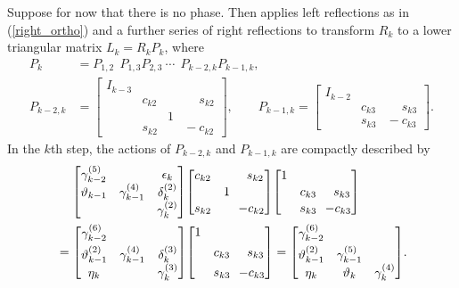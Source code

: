 \documentclass{doc_acmtrans2m}
\begin{document}
Suppose for now that there is no \MINRES phase. Then \MINRESQLP
applies left reflections as in (\ref{right_ortho}) and a further
series of right reflections to transform $R_k$ to a lower triangular
matrix $L_k = R_k P_k$, where
\begin{align*}
     P_k &=  P_{1,2} \ \ P_{1,3} P_{2,3} %
       \ \cdots \ \ P_{k-2,k} P_{k-1,k},
\\ P_{k-2,k} &=  \left[\begin{smallmatrix}
           I_{k-3}&&
        \\        & c_{k2} &    & \!\!\phantom-s_{k2}
        \\        &        & 1  &
        \\        & s_{k2} &    & \!-c_{k2}
        \end{smallmatrix}\right]\!\!,
\qquad P_{k-1,k} =  \left[\begin{smallmatrix}
           I_{k-2}&&
        \\        & c_{k3} &   \!\!\phantom-s_{k3}
        \\        & s_{k3} &   \!-c_{k3}
        \end{smallmatrix}\right]\!\!.
\end{align*}
In the $k$th step, the actions of $P_{k-2,k}$ and $P_{k-1,k}$ are
compactly described by
\begin{align}
 &\hspace*{13pt}
  \bmat{\gamma_{k-2}^{(5)} &                    & \epsilon_k
     \\ \vartheta_{k-1}    & \gamma_{k-1}^{(4)} & \delta_k^{(2)}
     \\                    &                    & \gamma_{k}^{(2)}
       }
  \bmat{c_{k2} &   & \!\!\!\phantom-s_{k2}
     \\        & 1 &
     \\ s_{k2} &   & \!\!-c_{k2}
       }
  \bmat{ 1
     \\    & c_{k3} & \!\!\!\phantom-s_{k3}
     \\    & s_{k3} & \!\!-c_{k3}
       }
       \nonumber
\\ &=
  \bmat{\gamma_{k-2}^{(6)}\vspace{3pt} 
     \\ \vartheta_{k-1}^{(2)} & \gamma_{k-1}^{(4)}  & \delta_k^{(3)}
     \\ \eta_{k}              &                     & \gamma_{k}^{(3)}
       }
  \bmat{ 1 \vspace{3pt} 
     \\    & c_{k3} & \!\!\!\phantom-s_{k3} \vspace{3pt} 
     \\    & s_{k3} & \!\!-c_{k3}
       }
= \bmat{\gamma_{k-2}^{(6)}\vspace{3pt} 
     \\ \vartheta_{k-1}^{(2)} & \gamma_{k-1}^{(5)}  &
     \\ \eta_{k}              & \vartheta_{k}       & \gamma_{k}^{(4)}
       }.                        \label{Lk-compact}
\end{align}
\end{document}
